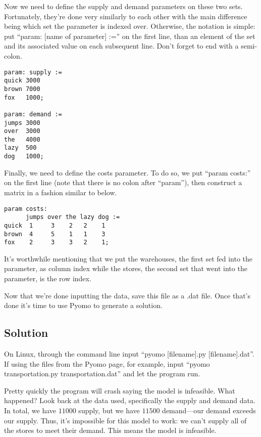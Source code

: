 \documentclass{article}
\begin{document}
Now we need to define the supply and demand parameters on these two sets.  Fortunately, they're done very similarly to each other with the main difference being which set the parameter is indexed over.  Otherwise, the notation is simple: put ``param: [name of parameter] :='' on the first line, than an element of the set and its associated value on each subsequent line.  Don't forget to end with a semi-colon.

\begin{verbatim}
param: supply :=
quick 3000
brown 7000
fox   1000;

param: demand :=
jumps 3000
over  3000
the   4000
lazy  500
dog   1000;
\end{verbatim}

Finally, we need to define the costs parameter.  To do so, we put ``param costs:'' on the first line (note that there is no colon after ``param''), then construct a matrix in a fashion similar to below.

\begin{verbatim}
param costs:
      jumps over the lazy dog :=
quick  1     3    2   2    1
brown  4     5    1   1    3
fox    2     3    3   2    1;
\end{verbatim}

\noindent
It's worthwhile mentioning that we put the warehouses, the first set fed into the parameter, as column index while the stores, the second set that went into the parameter, is the row index.

Now that we're done inputting the data, save this file as a .dat file.  Once that's done it's time to use Pyomo to generate a solution.

\subsection*{Solution}

On Linux, through the command line input ``pyomo [filename].py [filename].dat''.  If using the files from the Pyomo page, for example, input ``pyomo transportation.py transportation.dat'' and let the program run.

Pretty quickly the program will crash saying the model is infeasible.  What happened?  Look back at the data used, specifically the supply and demand data.  In total, we have $11000$ supply, but we have $11500$ demand---our demand exceeds our supply.  Thus, it's impossible for this model to work: we can't supply all of the stores to meet their demand.  This means the model is infeasible.
\end{document}
